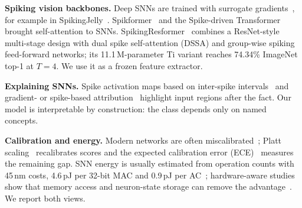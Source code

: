 \documentclass[conference]{IEEEtran}
\begin{document}
\textbf{Spiking vision backbones.} Deep SNNs are trained with surrogate gradients~\cite{neftci2019surrogate}, for example in SpikingJelly~\cite{fang2023spikingjelly}. Spikformer~\cite{zhou2023spikformer} and the Spike-driven Transformer~\cite{yao2023spike} brought self-attention to SNNs. SpikingResformer~\cite{shi2024spikingresformer} combines a ResNet-style multi-stage design with dual spike self-attention (DSSA) and group-wise spiking feed-forward networks; its 11.1\,M-parameter Ti variant reaches 74.34\% ImageNet top-1 at $T=4$. We use it as a frozen feature extractor.

\textbf{Explaining SNNs.} Spike activation maps based on inter-spike intervals~\cite{kim2021visual} and gradient- or spike-based attribution~\cite{bitar2023gradient,nguyen2023feature} highlight input regions after the fact. Our model is interpretable by construction: the class depends only on named concepts.

\textbf{Calibration and energy.} Modern networks are often miscalibrated~\cite{guo2017calibration}; Platt scaling~\cite{platt1999probabilistic} recalibrates scores and the expected calibration error (ECE)~\cite{naeini2015obtaining} measures the remaining gap. SNN energy is usually estimated from operation counts with 45\,nm costs, 4.6\,pJ per 32-bit MAC and 0.9\,pJ per AC~\cite{horowitz2014computing,shi2024spikingresformer}; hardware-aware studies show that memory access and neuron-state storage can remove the advantage~\cite{dampfhoffer2023snns}. We report both views.
\end{document}
